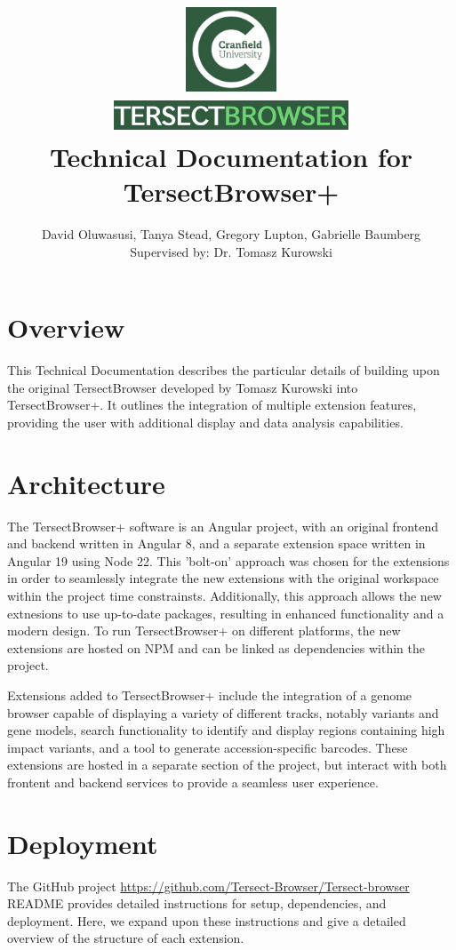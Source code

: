 \documentclass[12pt]{article}
\title{
{\includegraphics[width=3cm, height=2.5cm]{Cran.jpg}}
\\
\includegraphics[width=7cm, height=1cm]{TB.jpg}
\\
{Technical Documentation for TersectBrowser+}
}
\author{David Oluwasusi, Tanya Stead, Gregory Lupton, Gabrielle Baumberg \\ Supervised by: Dr. Tomasz Kurowski}
\begin{document}
\sloppy %

\maketitle

\section{Overview}
This Technical Documentation describes the particular details of building upon the original TersectBrowser developed by Tomasz Kurowski into  TersectBrowser+. It outlines the integration of multiple extension features, providing the user with additional display and data analysis capabilities.

\section{Architecture}
The TersectBrowser+ software is an Angular project, with an original frontend and backend written in Angular 8, and a separate extension space written in Angular 19 using Node 22. This 'bolt-on' approach was chosen for the extensions in order to seamlessly integrate the new extensions with the original workspace within the project time constrainsts. Additionally, this approach allows the new extnesions to use up-to-date packages, resulting in enhanced functionality and a modern design. To run TersectBrowser+ on different platforms, the new extensions are hosted on NPM and can be linked as dependencies within the project.

Extensions added to TersectBrowser+ include the integration of a genome browser capable of displaying a variety of different tracks, notably variants and gene models, search functionality to identify and display regions containing high impact variants, and a tool to generate accession-specific barcodes. These extensions are hosted in a separate section of the project, but interact with both frontent and backend services to provide a seamless user experience.

\section{Deployment}
The GitHub project \url{https://github.com/Tersect-Browser/Tersect-browser} README provides detailed instructions for setup, dependencies, and deployment. Here, we expand upon these instructions and give a detailed overview of the structure of each extension.
\end{document}
